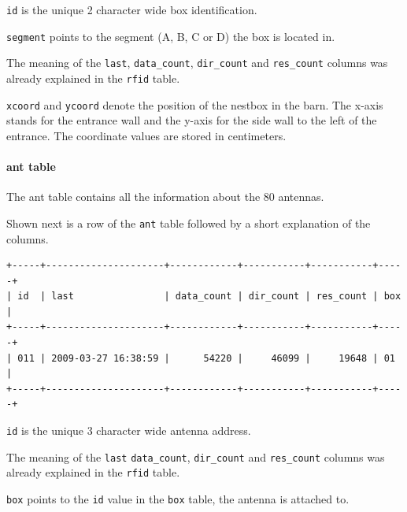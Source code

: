 \begin{mydesc}
\item \lstinline|id| is the unique 2 character wide box identification.
\item \lstinline|segment| points to the segment (A, B, C or D) the box is located in.
\item The meaning of the \lstinline|last|, \lstinline|data_count|, \lstinline|dir_count| and \lstinline|res_count| columns was already explained in the \lstinline|rfid| table.
\item \lstinline|xcoord| and \lstinline|ycoord| denote the position of the nestbox in the barn. The x-axis stands for the entrance wall and the y-axis for  the side wall to the left of the entrance. The coordinate values are stored in centimeters. 
\end{mydesc}

\newpage

\paragraph{ant table} 
\label{para:ant_table}

The ant table contains all the information about the 80 antennas. 

Shown next is a row of the \lstinline|ant| table followed by a short explanation of the columns.
\codescript
{}
\begin{lstlisting}[frame=none]
+-----+---------------------+------------+-----------+-----------+-----+
| id  | last                | data_count | dir_count | res_count | box |
+-----+---------------------+------------+-----------+-----------+-----+
| 011 | 2009-03-27 16:38:59 |      54220 |     46099 |     19648 | 01  | 
+-----+---------------------+------------+-----------+-----------+-----+

\end{lstlisting}

\begin{mydesc}
\item \lstinline|id| is the unique 3 character wide antenna address.
\item The meaning of the \lstinline|last| \lstinline|data_count|, \lstinline|dir_count| and \lstinline|res_count| columns was already explained in the \lstinline|rfid| table.
\item \lstinline|box| points to the \lstinline|id| value in the \lstinline|box| table, the antenna is attached to.
\end{mydesc}

